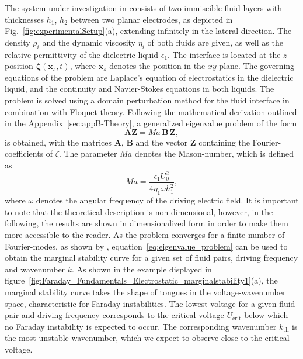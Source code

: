 \documentclass{jfm_arxiv}
\renewcommand\vec{\mathbf}
\newcommand{\matr}[1]{\bm{#1}}     %
\begin{document}
The system under investigation in \citet{Bandopadhyay2017} consists of two immiscible fluid layers
with thicknesses $h_{1}$, $h_{2}$ between two planar electrodes, as depicted in Fig.~\ref{fig:experimentalSetup}(a), extending infinitely in the lateral direction.
The density $\rho_i$ and the dynamic viscosity $\eta_i$ of both fluids are given, as well as the relative permittivity of the dielectric liquid $\epsilon_1$.
The interface is located at the $z$-position $ \vec{\zeta} (\vec{x}_s,t)$, where $\vec{x}_s$ denotes the position in the $xy$-plane.
The governing equations of the problem are Laplace's equation of electrostatics in the dielectric liquid, and the continuity and Navier-Stokes equations in both liquids. 
The problem is solved using a domain perturbation method for the fluid interface in combination with Floquet theory. Following the mathematical derivation outlined in the Appendix~\ref{sec:appB-Theory}, a generalized eigenvalue problem of the form 
\begin{equation}
\label{eq:eigenvalue_problem}
\matr{A}\vec{Z} = Ma\,\matr{B}\,\vec{Z},
\end{equation}
is obtained, with the matrices $\matr{A}$, $\matr{B}$ and the vector $\vec{Z}$ containing the Fourier-coefficients of $\zeta$. 
The parameter $Ma$ denotes the Mason-number, which is defined as 
\begin{equation}
Ma  = \frac{\epsilon_1 U_0^2}{4 \eta_1 \omega h_1^2},
\end{equation}
where $\omega$ denotes the angular frequency of the driving electric field.
It is important to note that the theoretical description is non-dimensional, however, in the following, the results are shown in dimensionalized form in order to make them more accessible to the reader.
As the problem converges for a finite number of Fourier-modes, as shown by \citet{Bandopadhyay2017}, equation~\ref{eq:eigenvalue_problem} can be used to obtain the marginal stability curve for a given set of fluid pairs, driving frequency and wavenumber $k$.
As shown in the example displayed in figure~\ref{fig:Faraday_Fundamentals_Electrostatic_marginalstability1}(a), the marginal stability curve takes the shape of tongues in the voltage-wavenumber space, characteristic for Faraday instabilities. 
The lowest voltage for a given fluid pair and driving frequency corresponds to the critical voltage $U_\mathrm{crit}$ below which no Faraday instability is expected to occur. 
The corresponding wavenumber $k_\mathrm{th}$ is the most unstable wavenumber, which we expect to observe close to the critical voltage.
\end{document}
